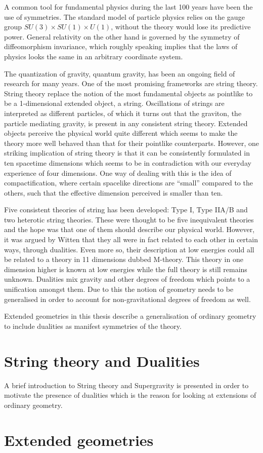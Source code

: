 A common tool for fundamental physics during the last 100 years have been the use of symmetries. The standard model of particle physics relies on the gauge group $SU(3)\times SU(1)\times U(1)$, without the theory would lose its predictive power. General relativity on the other hand is governed by the symmetry of diffeomorphism invariance, which roughly speaking implies that the laws of physics looks the same in an arbitrary coordinate system. 

The quantization of gravity, quantum gravity, has been an ongoing field of research for many years. One of the most promising frameworks are string theory. String theory replace the notion of the most fundamental objects as pointlike to be a 1-dimensional extended object, a string. Oscillations of strings are interpreted as different particles, of which it turns out that the graviton, the particle mediating gravity, is present in any consistent string theory. Extended objects perceive the physical world quite different which seems to make the theory more well behaved than that for their pointlike counterparts. However, one striking implication of string theory is that it can be consistently formulated in ten spacetime dimensions which seems to be in contradiction with our everyday experience of four dimensions. One way of dealing with this is the idea of compactification, where certain spacelike directions are ``small'' compared to the others, such that the effective dimension perceived is smaller than ten. 

Five consistent theories of string has been developed: Type I, Type IIA/B and two heterotic string theories. These were thought to be five inequivalent theories and the hope was that one of them should describe our physical world. However, it was argued by Witten \cite{WittenDualities1995} that they all were in fact related to each other in certain ways, through dualities. Even more so, their description at low energies could all be related to a theory in 11 dimensions dubbed M-theory. This theory in one dimension higher is known at low energies while the full theory is still remains unknown. Dualities mix gravity and other degrees of freedom which points to a unification amongst them. Due to this the notion of geometry needs to be generalised in order to account for non-gravitational degrees of freedom as well.

Extended geometries in this thesis describe a generalisation of ordinary geometry to include dualities as manifest symmetries of the theory. 


\section{String theory and Dualities}

A brief introduction to String theory and Supergravity is presented in order to motivate the presence of dualities which is the reason for looking at extensions of ordinary geometry.

\section{Extended geometries}


